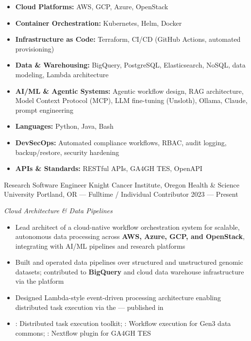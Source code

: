 




\begin{itemize}
    \item \textbf{Cloud Platforms:} AWS, GCP, Azure, OpenStack
    \item \textbf{Container Orchestration:} Kubernetes, Helm, Docker
    \item \textbf{Infrastructure as Code:} Terraform, CI/CD (GitHub Actions, automated provisioning)
    \item \textbf{Data \& Warehousing:} BigQuery, PostgreSQL, Elasticsearch, NoSQL, data modeling, Lambda architecture
    \item \textbf{AI/ML \& Agentic Systems:} Agentic workflow design, RAG architecture, Model Context Protocol (MCP), LLM fine-tuning (Unsloth), Ollama, Claude, prompt engineering
    \item \textbf{Languages:} Python, Java, Bash
    \item \textbf{DevSecOps:} Automated compliance workflows, RBAC, audit logging, backup/restore, security hardening
    \item \textbf{APIs \& Standards:} RESTful APIs, GA4GH TES, OpenAPI
\end{itemize}


\showoff
{Research Software Engineer}
{Knight Cancer Institute, Oregon Health \& Science University}
{Portland, OR --- Fulltime / Individual Contributor}
{2023 --- Present}

\vspace{1em}

\emph{Cloud Architecture \& Data Pipelines}

\begin{itemize}
    \item Lead architect of a cloud-native workflow orchestration system for scalable, autonomous data processing across \textbf{AWS, Azure, GCP, and OpenStack}, integrating with AI/ML pipelines and research platforms
    \item Built and operated data pipelines over structured and unstructured genomic datasets; contributed to \textbf{BigQuery} and cloud data warehouse infrastructure via the  platform
    \item Designed Lambda-style event-driven processing architecture enabling distributed task execution via the  --- published in 
    \item {}: Distributed task execution toolkit; : Workflow execution for Gen3 data commons; : Nextflow plugin for GA4GH TES
\end{itemize}

